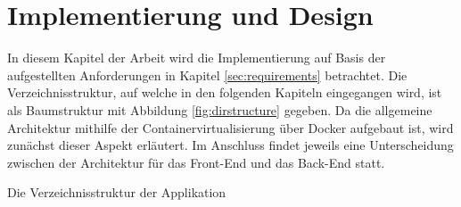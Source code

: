 \chapter{Implementierung und Design}
\label{sec:implementation}
In diesem Kapitel der Arbeit wird die Implementierung auf Basis der aufgestellten Anforderungen in Kapitel \ref{sec:requirements} betrachtet. Die Verzeichnisstruktur, auf welche in den folgenden Kapiteln eingegangen wird, ist als Baumstruktur mit Abbildung \ref{fig:dirstructure} gegeben. Da die allgemeine Architektur mithilfe der Containervirtualisierung über Docker aufgebaut ist, wird zunächst dieser Aspekt erläutert. Im Anschluss findet jeweils eine Unterscheidung zwischen der Architektur für das Front-End und das Back-End statt.
\begin{marginfigure}
    \centering
    \begin{adjustbox}{width=\textwidth}
    \end{adjustbox}
    \caption{Die Verzeichnisstruktur der Applikation}
    \label{fig:dirstructure}
\end{marginfigure}

